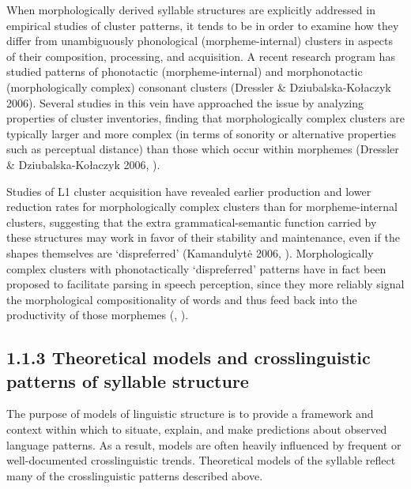   When morphologically derived syllable structures are explicitly addressed in empirical studies of cluster patterns, it tends to be in order to examine how they differ from unambiguously phonological (morpheme-internal) clusters in aspects of their composition, processing, and acquisition. A recent research program has studied patterns of phonotactic (morpheme-internal) and morphonotactic (morphologically complex) consonant clusters (Dressler \& Dziubalska-Kołaczyk 2006). Several studies in this vein have approached the issue by analyzing properties of cluster inventories, finding that morphologically complex clusters are typically larger and more complex (in terms of sonority or alternative properties such as perceptual distance) than those which occur within morphemes (Dressler \& Dziubalska-Kołaczyk 2006, \citealt{Orzechowska2012}). 



  Studies of L1 cluster acquisition have revealed earlier production and lower reduction rates for morphologically complex clusters than for morpheme-internal clusters, suggesting that the extra grammatical-semantic function carried by these structures may work in favor of their stability and maintenance, even if the shapes themselves are ‘dispreferred’ (Kamandulyt\.e 2006, \citealt{Zydorowicz2010}). Morphologically complex clusters with phonotactically ‘dispreferred’ patterns have in fact been proposed to facilitate parsing in speech perception, since they more reliably signal the morphological compositionality of words and thus feed back into the productivity of those morphemes (\citealt{HayBaayen2003}, \citealt{DresslerEtAl2010}). 


\subsection{1.1.3 Theoretical models and crosslinguistic patterns of syllable structure}

  The purpose of models of linguistic structure is to provide a framework and context within which to situate, explain, and make predictions about observed language patterns. As a result, models are often heavily influenced by frequent or well-documented crosslinguistic trends. Theoretical models of the syllable reflect many of the crosslinguistic patterns described above. 



